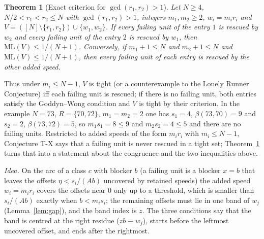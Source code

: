 \documentclass[11pt]{article}
\newtheorem{theorem}{Theorem}[section]
\theoremstyle{definition}
\theoremstyle{remark}
\newcommand{\ML}{\mathrm{ML}}
\begin{document}
\begin{theorem}[Exact criterion for $\gcd(r_1,r_2)>1$]\label{thm:T}
Let $N\ge4$, $N/2<r_1<r_2\le N$ with $\gcd(r_1,r_2)>1$, integers $m_1,m_2\ge2$, $w_i=m_ir_i$ and $V=([N]\setminus\{r_1,r_2\})\cup\{w_1,w_2\}$. If every failing unit of the entry $1$ is rescued by $w_2$ and every failing unit of the entry $2$ is rescued by $w_1$, then $\ML(V)\le1/(N+1)$. Conversely, if $m_1+1\le N$ and $m_2+1\le N$ and $\ML(V)\le1/(N+1)$, then every failing unit of each entry is rescued by the other added speed.
\end{theorem}
Thus under $m_i\le N-1$, $V$ is tight (or a counterexample to the Lonely Runner Conjecture) iff each failing unit is rescued; if there is no failing unit, both entries satisfy the Goddyn--Wong condition and $V$ is tight by their criterion. In the example $N=73$, $R=\{70,72\}$, $m_1=m_2=2$ one has $s_1=4$, $\beta(73,70)=9$ and $s_2=2$, $\beta(73,72)=5$, so $m_1s_1=8\le9$ and $m_2s_2=4\le5$ and there are no failing units. Restricted to added speeds of the form $m_ir_i$ with $m_i\le N-1$, Conjecture T-X says that a failing unit is never rescued in a tight set; Theorem~\ref{thm:T} turns that into a statement about the congruence and the two inequalities above.

\emph{Idea.} On the arc of a class $c$ with blocker $b$ (a failing unit is a blocker $x=b$ that leaves the offsets $\eta<s_i/(Ab)$ uncovered by retained speeds) the added speed $w_i=m_ir_i$ covers the offsets near $0$ only up to a threshold, which is smaller than $s_i/(Ab)$ exactly when $b<m_is_i$; the remaining offsets must lie in one band of $w_j$ (Lemma~\ref{lem:gap}), and the band index is $z$. The three conditions say that the band is centred at the right residue ($zb\equiv w_j$), starts before the leftmost uncovered offset, and ends after the rightmost.
\end{document}
